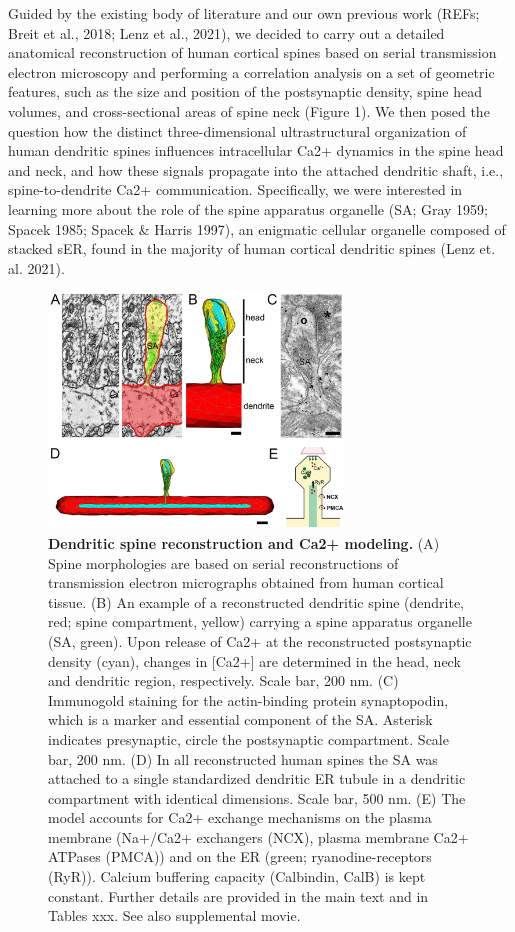 \documentclass[fleqn,10pt]{wlscirep}
\begin{document}
	Guided by the existing body of literature and our own previous work (REFs; Breit et al., 2018; Lenz et al., 2021), we decided to carry out a detailed anatomical reconstruction of human cortical spines based on serial transmission electron microscopy and performing a correlation analysis on a set of geometric features, such as the size and position of the postsynaptic density, spine head volumes, and cross-sectional areas of spine neck (Figure 1). We then posed the question how the distinct three-dimensional ultrastructural organization of human dendritic spines influences intracellular Ca2+ dynamics in the spine head and neck, and how these signals propagate into the attached dendritic shaft, i.e., spine-to-dendrite Ca2+ communication. Specifically, we were interested in learning more about the role of the spine apparatus organelle (SA; Gray 1959; Spacek 1985; Spacek \& Harris 1997), an enigmatic cellular organelle composed of stacked sER, found in the majority of human cortical dendritic spines (Lenz et. al. 2021).

\begin{figure}[h!]
\centering
\includegraphics[width=0.7\textwidth]{images/figure1.png}
\caption{{\small\textbf{Dendritic spine reconstruction and Ca2+ modeling.} (A) Spine morphologies are based on serial reconstructions of transmission electron micrographs obtained from human cortical tissue. (B) An example of a reconstructed dendritic spine (dendrite, red; spine compartment, yellow) carrying a spine apparatus organelle (SA, green). Upon release of Ca2+ at the reconstructed postsynaptic density (cyan), changes in [Ca2+] are determined in the head, neck and dendritic region, respectively. Scale bar, 200 nm. (C) Immunogold staining for the actin-binding protein synaptopodin, which is a marker and essential component of the SA. Asterisk indicates presynaptic, circle the postsynaptic  compartment. Scale bar, 200 nm. (D) In all reconstructed human spines the SA was attached to a single standardized dendritic ER tubule in a dendritic compartment with identical dimensions. Scale bar, 500 nm. (E) The model accounts for Ca2+ exchange mechanisms on the plasma membrane (Na+/Ca2+ exchangers (NCX), plasma membrane Ca2+ ATPases (PMCA)) and on the ER (green; ryanodine-receptors (RyR)). Calcium buffering capacity (Calbindin, CalB) is kept constant. Further details are provided in the main text and in Tables xxx. See also supplemental movie.}}
\end{figure}
\end{document}
